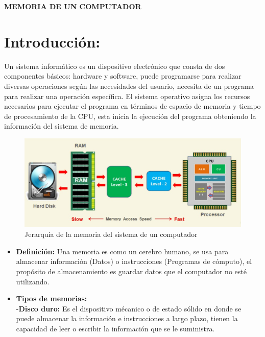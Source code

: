 \documentclass{article}
\begin{document}



\vfill

\newpage
\begin{center}
    \title{}
    \textbf{MEMORIA DE UN COMPUTADOR}    
\end{center}
\section*{Introducción:}
\begin{flushleft}
    Un sistema informático es un dispositivo electrónico que consta de dos componentes básicos: hardware y software, puede programarse para realizar diversas operaciones según las necesidades del usuario, necesita de un programa para realizar una operación específica. El sistema operativo asigna los recursos necesarios para ejecutar el programa en términos de espacio de memoria y tiempo de procesamiento de la CPU, esta inicia la ejecución del programa obteniendo la información del sistema de memoria.
    \begin{figure}[htp]
        \includegraphics[width=14cm]{Images/Sistema de memoria.PNG}
        \caption{Jerarquía de la memoria del sistema de un computador}
        \label{hola:out}
    \end{figure}
    \begin{itemize}
        \item \textbf{Definición:} Una memoria es como un cerebro humano, se usa para almacenar información (Datos) o instrucciones (Programas de cómputo), el propósito de almacenamiento es guardar datos que el computador no esté utilizando.
        \item \textbf{Tipos de memorias:}\\
        -\textbf{Disco duro:} Es el dispositivo mécanico o de estado sólido en donde se puede almacenar la información e instrucciones a largo plazo, tienen la capacidad de leer o escribir la información que se le suministra.\\

\end{itemize}
\end{flushleft}
\end{document}
